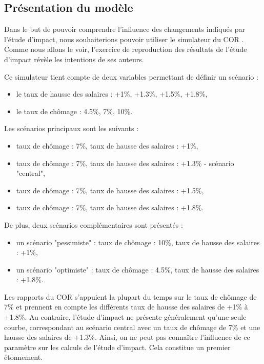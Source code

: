 \documentclass[10pt]{article}
\begin{document}
\subsection{Présentation du modèle}

Dans le but de pouvoir comprendre l'influence des changements indiqués par 
l'étude d'impact, nous souhaiterions pouvoir utiliser le simulateur du COR 
\cite{SimulateurCOR}. 
Comme nous allons le voir, l'exercice de reproduction des résultats 
de l'étude d'impact révèle les intentions de ses auteurs. 

Ce simulateur tient compte de deux variables permettant de définir un scénario :
\begin{itemize}
\item le taux de hausse des salaires : +1\%, +1.3\%, +1.5\%, +1.8\%, 
\item le taux de chômage : 4.5\%, 7\%, 10\%.
\end{itemize}

Les scénarios principaux sont les suivants :
\begin{itemize}
\item taux de chômage : 7\%, taux de hausse des salaires : +1\%, 
\item taux de chômage : 7\%, taux de hausse des salaires : +1.3\% - scénario "central", 
\item taux de chômage : 7\%, taux de hausse des salaires : +1.5\%, 
\item taux de chômage : 7\%, taux de hausse des salaires : +1.8\%.
\end{itemize}
De plus, deux scénarios complémentaires sont présentés :
\begin{itemize}
\item un scénario "pessimiste" : taux de chômage : 10\%, taux de hausse des salaires : +1\%, 
\item un scénario "optimiste" : taux de chômage : 4.5\%, taux de hausse des salaires : +1.8\%. 
\end{itemize}

Les rapports du COR s'appuient la plupart du temps sur le taux 
de chômage de 7\% et prennent en compte les différents taux de hausse 
des salaires de +1\% à +1.8\%. 
Au contraire, l'étude d'impact ne présente généralement qu'une seule 
courbe, correspondant au scénario central avec un taux de chômage de 7\% et une hausse des 
salaires de +1.3\%. 
Ainsi, on ne peut pas connaître l'influence de ce paramètre sur les calculs 
de l'étude d'impact. 
Cela constitue un premier étonnement. 
\end{document}
